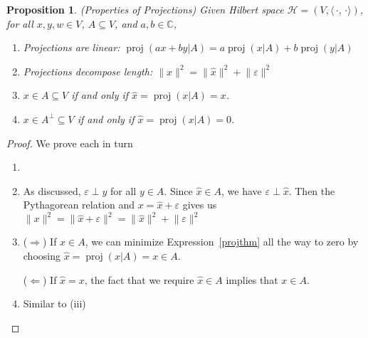 \documentclass[12pt]{article}
\numberwithin{equation}{section} %
\theoremstyle{plain}
\newtheorem{prop}[thm]{Proposition}
\theoremstyle{definition}
\theoremstyle{remark}
\newcommand{\proj}{\operatorname{proj}}
\newcommand{\calH}{\mathcal{H}}
\newcommand{\C}{\mathbb{C}}
\begin{document}
\begin{prop}\emph{(Properties of Projections)}
Given Hilbert space $\calH=(V,\langle\,\cdot,\,\cdot\rangle)$,
for all $x,y,w\in V$, $A\subseteq V$, and $a,b\in\C$,
\begin{enumerate}[label=\emph{(\roman*)}]
  \item \emph{Projections are linear}:
    $\proj(ax+by|A) = a\proj(x|A)+b\proj(y|A)$
  \item \emph{Projections decompose length}:
    $\lVert x\rVert^2
    = \lVert\hat{x}\rVert^2 + \lVert \varepsilon\rVert^2$
  \item $x\in A\subseteq V$ if and only if $\hat{x}=\proj(x|A)=x$.
  \item $x\in A^\perp \subseteq V$ if and only if
    $\hat{x}=\proj(x|A)=0$.
\end{enumerate}
\end{prop}
\begin{proof}
We prove each in turn
\begin{enumerate}[label=(\roman*)]
  \item
  \item As discussed, $\varepsilon\perp y$ for all $y\in A$.
    Since $\hat{x}\in A$, we have $\varepsilon\perp \hat{x}$.
    Then the Pythagorean relation and $x=\hat{x}+\varepsilon$ gives us
    $\lVert x\rVert^2 = \lVert \hat{x}+\varepsilon\rVert^2 =\lVert
    \hat{x}\rVert^2 + \lVert \varepsilon\rVert^2$
  \item
    ($\Rightarrow$)
    If $x\in A$, we can minimize Expression~\ref{projthm}
    all the way to zero by choosing $\hat{x}=\proj(x|A)=x\in A$.

    ($\Leftarrow$) If $\hat{x}=x$, the fact that we require
    $\hat{x}\in A$ implies that $x\in A$.
  \item Similar to (iii)
\end{enumerate}
\end{proof}
\end{document}

